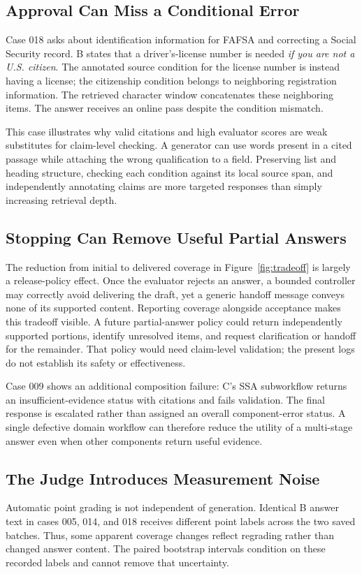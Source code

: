 \subsection{Approval Can Miss a Conditional Error}
Case 018 asks about identification information for FAFSA and correcting a Social Security record. B states that a driver's-license number is needed \emph{if you are not a U.S. citizen}. The annotated source condition for the license number is instead having a license; the citizenship condition belongs to neighboring registration information. The retrieved character window concatenates these neighboring items. The answer receives an online pass despite the condition mismatch.

This case illustrates why valid citations and high evaluator scores are weak substitutes for claim-level checking. A generator can use words present in a cited passage while attaching the wrong qualification to a field. Preserving list and heading structure, checking each condition against its local source span, and independently annotating claims are more targeted responses than simply increasing retrieval depth.

\subsection{Stopping Can Remove Useful Partial Answers}
The reduction from initial to delivered coverage in Figure~\ref{fig:tradeoff} is largely a release-policy effect. Once the evaluator rejects an answer, a bounded controller may correctly avoid delivering the draft, yet a generic handoff message conveys none of its supported content. Reporting coverage alongside acceptance makes this tradeoff visible. A future partial-answer policy could return independently supported portions, identify unresolved items, and request clarification or handoff for the remainder. That policy would need claim-level validation; the present logs do not establish its safety or effectiveness.

Case 009 shows an additional composition failure: C's SSA subworkflow returns an insufficient-evidence status with citations and fails validation. The final response is escalated rather than assigned an overall component-error status. A single defective domain workflow can therefore reduce the utility of a multi-stage answer even when other components return useful evidence.

\subsection{The Judge Introduces Measurement Noise}
Automatic point grading is not independent of generation. Identical B answer text in cases 005, 014, and 018 receives different point labels across the two saved batches. Thus, some apparent coverage changes reflect regrading rather than changed answer content. The paired bootstrap intervals condition on these recorded labels and cannot remove that uncertainty.

